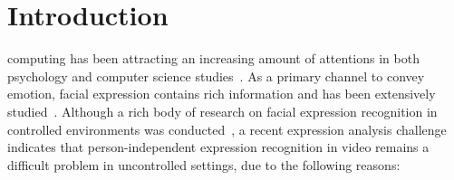 \documentclass[journal]{IEEEtran}
\begin{document}
\section{Introduction}

 computing has been attracting an increasing amount of attentions in both psychology and computer science studies~\cite{Picard03}. As a primary channel to convey emotion, facial expression contains rich information and has been extensively studied~\cite{Pantic_PAMI00,Torre11}. Although a rich body of research on facial expression recognition in controlled environments was conducted~\cite{Torre11}, a recent expression analysis challenge~\cite{FERA11} indicates that person-independent expression recognition in video remains a difficult problem in uncontrolled settings, due to the following reasons:
\end{document}
